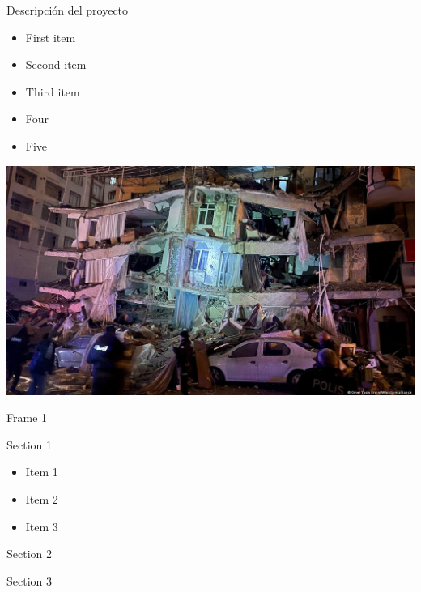 \documentclass[
	12pt, %
	aspectratio=169, %
]{beamer}
\begin{document}
\begin{frame}{Descripción del proyecto}
\begin{minipage}{0.47\textwidth}
    \begin{itemize}
        \item First item
        \item Second item
        \item Third item
        \item Four
        \item Five
    \end{itemize}
\end{minipage}
\begin{minipage}{0.5\textwidth}
  \includegraphics[width=\textwidth]{turquia2}
\end{minipage}
\end{frame}

\begin{frame}{Frame 1}  
  \begin{multicols}{2}
    \begin{minipage}[b][20ex][t]{\linewidth}
      Section 1
      \begin{itemize}
      \item<1-> Item 1
      \item<2-> Item 2
      \item<3-> Item 3
      \end{itemize}
    \end{minipage}
    \begin{minipage}[b][20ex][t]{\linewidth}
      Section 2
    \end{minipage}
    
    \begin{minipage}[b][40ex][t]{\linewidth}
      Section 3
      
    \end{minipage}
  \end{multicols}
\end{frame}
\end{document}
